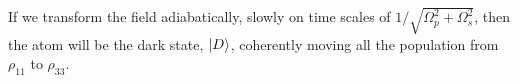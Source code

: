 If we transform the field adiabatically, slowly on time scales of $1/\sqrt{\Omega_{p}^{2} + \Omega_{s}^{2}}$, then the atom will be the dark state, $\ket{D}$, coherently moving all the population from $\rho_{11}$ to $\rho_{33}$.
